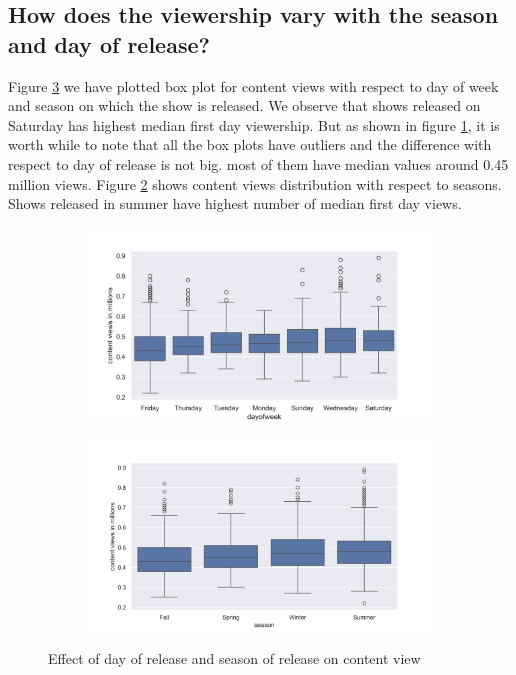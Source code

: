 \documentclass[12pt,a4paper]{style}
\begin{document}
\subsection{How does the viewership vary with the season and day of release?}
Figure \ref{fig:day and season effect} we have plotted box plot for content views with respect to day of week and season on which the show is released. We observe that shows released on Saturday has highest median first day viewership. But as shown in figure \ref{fig:content_views_vs_dayofweek}, it is worth while to note that all the box plots have outliers and the difference with respect to day of release is not big. most of them have median values around 0.45 million views. Figure \ref{fig:content_views_vs_season} shows content views distribution with respect to seasons. Shows released in summer have highest number of median first day views. 
\begin{figure}
	\centering
	\begin{subfigure}[t]{0.49\textwidth}
		\includegraphics[width=\textwidth]{content_views_vs_dayofweek.png}
		\caption{}
		\label{fig:content_views_vs_dayofweek}
	\end{subfigure}
	\hfill
	\begin{subfigure}[t]{0.49\textwidth}
		\includegraphics[width=\textwidth]{content_views_vs_season.png}
		\caption{}
		\label{fig:content_views_vs_season}
	\end{subfigure}
	\caption{Effect of day of release and season of release on content view}
	\label{fig:day and season effect}
\end{figure}
\end{document}
